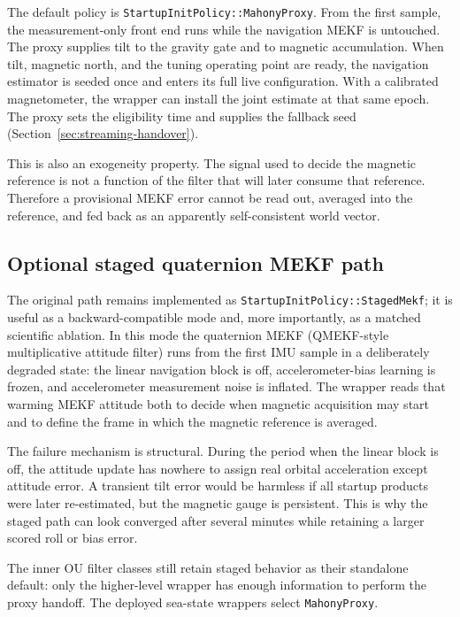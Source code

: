 \documentclass[conference]{IEEEtran}
\begin{document}
The default policy is \texttt{StartupInitPolicy::}\allowbreak\texttt{MahonyProxy}. From the first
sample, the measurement-only front end runs while the navigation MEKF is untouched.
The proxy supplies tilt to the gravity gate and to magnetic accumulation.  When tilt,
magnetic north, and the tuning operating point are ready, the navigation estimator is
seeded once and enters its full live configuration. With a calibrated magnetometer,
the wrapper can install the joint estimate at that same epoch. The proxy sets the
eligibility time and supplies the fallback seed (Section~\ref{sec:streaming-handover}).

This is also an exogeneity property.  The signal used to decide the magnetic reference
is not a function of the filter that will later consume that reference.  Therefore a
provisional MEKF error cannot be read out, averaged into the reference, and fed back as
an apparently self-consistent world vector.

\subsection{Optional staged quaternion MEKF path}

The original path remains implemented as
\texttt{StartupInitPolicy::StagedMekf}; it is useful as a backward-compatible mode and,
more importantly, as a matched scientific ablation.  In this mode the quaternion
MEKF (QMEKF-style multiplicative attitude filter) runs from the first IMU sample in a
deliberately degraded state: the linear navigation block is off, accelerometer-bias
learning is frozen, and accelerometer measurement noise is inflated.  The wrapper
reads that warming MEKF attitude both to decide when magnetic acquisition may start
and to define the frame in which the magnetic reference is averaged.

The failure mechanism is structural.  During the period when the linear block is off,
the attitude update has nowhere to assign real orbital acceleration except attitude
error.  A transient tilt error would be harmless if all startup products were later
re-estimated, but the magnetic gauge is persistent.  This is why the staged path can
look converged after several minutes while retaining a larger scored roll or bias
error.

The inner OU filter classes still retain staged behavior as their standalone default:
only the higher-level wrapper has enough information to perform the proxy handoff.
The deployed sea-state wrappers select \texttt{MahonyProxy}.
\end{document}
